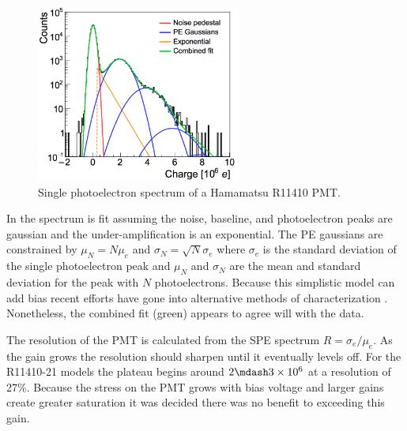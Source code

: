 \begin{figure}
\centering
\includegraphics[width=0.6\textwidth]{SPESpectrum}
\caption{Single photoelectron spectrum of a Hamamatsu R11410 PMT.}
\label{fig:xenon1t_pmt_spe}
\end{figure}

In  the spectrum is fit assuming the noise, baseline, and photoelectron peaks are gaussian and the
under-amplification is
an exponential.  The PE gaussians are constrained by $\mu_{N} = N \mu_{e}$ and $\sigma_{N} = \sqrt{N} \sigma_{e}$ where $\sigma_{e}$ is the
standard deviation of the single photoelectron peak and $\mu_{N}$ and $\sigma_{N}$ are the mean and standard deviation for the peak with
$N$ photoelectrons.  Because this simplistic model can add bias recent efforts have gone into alternative methods
of characterization .  Nonetheless, the combined fit (green) appears to agree will with the data.

The resolution of the PMT is calculated from the SPE spectrum $R = \sigma_{e} / \mu_{e}$.  As the gain grows the resolution should sharpen
until it eventually levels off.  For the R11410-21 models the plateau begins around $2 \mdash 3 \times 10^{6}$ at a resolution of
27\%.  Because the stress on the PMT grows with bias voltage and larger gains create greater saturation it was decided there was no
benefit to exceeding this gain.

